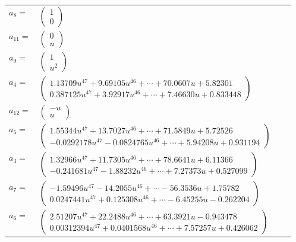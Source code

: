 \documentclass[1p]{elsarticle_modified}
\theoremstyle{definition}
\begin{document}
\begin{tabular}{m{7pt} m{180pt} m{7pt} m{180pt} }
\flushright $a_{8}=$&$\begin{pmatrix}1\\0\end{pmatrix}$ \\
\flushright $a_{11}=$&$\begin{pmatrix}0\\u\end{pmatrix}$ \\
\flushright $a_{9}=$&$\begin{pmatrix}1\\u^2\end{pmatrix}$ \\
\flushright $a_{4}=$&$\begin{pmatrix}1.13709 u^{47}+9.69105 u^{46}+\cdots+70.0607 u+5.82301\\0.387125 u^{47}+3.92917 u^{46}+\cdots+7.46630 u+0.833448\end{pmatrix}$ \\
\flushright $a_{12}=$&$\begin{pmatrix}- u\\u\end{pmatrix}$ \\
\flushright $a_{5}=$&$\begin{pmatrix}1.55344 u^{47}+13.7027 u^{46}+\cdots+71.5849 u+5.72526\\-0.0292178 u^{47}-0.0824765 u^{46}+\cdots+5.94208 u+0.931194\end{pmatrix}$ \\
\flushright $a_{3}=$&$\begin{pmatrix}1.32966 u^{47}+11.7305 u^{46}+\cdots+78.6641 u+6.11366\\-0.241681 u^{47}-1.88232 u^{46}+\cdots+7.27373 u+0.527099\end{pmatrix}$ \\
\flushright $a_{7}=$&$\begin{pmatrix}-1.59496 u^{47}-14.2055 u^{46}+\cdots-56.3536 u+1.75782\\0.0247441 u^{47}+0.125308 u^{46}+\cdots-6.45255 u-0.262204\end{pmatrix}$ \\
\flushright $a_{6}=$&$\begin{pmatrix}2.51207 u^{47}+22.2488 u^{46}+\cdots+63.3921 u-0.943478\\0.00312394 u^{47}+0.0401568 u^{46}+\cdots+7.57257 u+0.426062\end{pmatrix}$ \\

\end{tabular}
\end{document}
